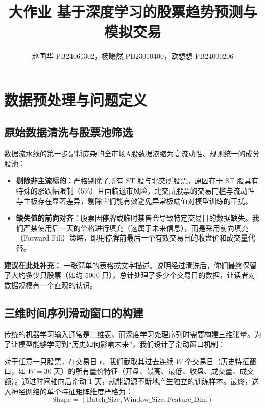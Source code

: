 \documentclass[9pt,a4paper,twoside]{rho-class/rho}
\title{大作业 基于深度学习的股票趋势预测与模拟交易}
\author{赵国华 PB24061302，杨曦然 PB23010400，欧想想 PB24000206}
\begin{document}
	
    \maketitle
    \thispagestyle{firststyle}


\section{数据预处理与问题定义}

    \subsection{原始数据清洗与股票池筛选}
    数据流水线的第一步是将庞杂的全市场A股数据浓缩为高流动性、规则统一的成分股池：
    \begin{itemize}
        \item \textbf{剔除非主流标的}：严格剔除了所有 ST 股与北交所股票。原因在于 ST 股具有特殊的涨跌幅限制（5\%）且面临退市风险，北交所股票的交易门槛与流动性与主板存在显著差异，剔除它们能有效避免异常极端值对模型训练的干扰。
        \item \textbf{缺失值的前向对齐}：股票因停牌或临时禁售会导致特定交易日的数据缺失。我们严禁使用后一天的价格进行填充（这属于未来信息），而是采用前向填充（Forward Fill）策略，即用停牌前最后一个有效交易日的收盘价和成交量代替。
    \end{itemize}
    \begin{rhoenv}[frametitle=填写建议：基础数据统计]
    \textbf{建议在此处补充：} 一张简单的表格或文字描述。说明经过清洗后，你们最终保留了大约多少只股票（如约 5000 只），总计处理了多少个交易日的数据，让读者对数据规模有一个直观的认识。
    \end{rhoenv}

    \subsection{三维时间序列滑动窗口的构建}
    传统的机器学习输入通常是二维表，而深度学习处理序列时需要构建三维张量。为了让模型能够学习到“历史如何影响未来”，我们设计了滑动窗口机制：
    
    对于任意一只股票，在交易日 $t$，我们截取其过去连续 $W$ 个交易日（历史特征窗口，如 $W=30$ 天）的所有量价特征（开盘、最高、最低、收盘、成交量、成交额）。通过时间轴向后滑动 1 天，就能源源不断地产生独立的训练样本。最终，送入神经网络的单个特征矩阵维度严格为：
    \begin{equation}
        \text{Shape} = (\text{Batch\_Size}, \text{Window\_Size}, \text{Feature\_Dim})
    \end{equation}
\end{document}
